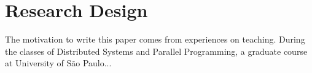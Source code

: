 \section{Research Design}
\label{sec:researchdesing}

The motivation to write this paper comes from experiences on teaching. During the classes of Distributed Systems and Parallel Programming, a graduate course at University of São Paulo...

